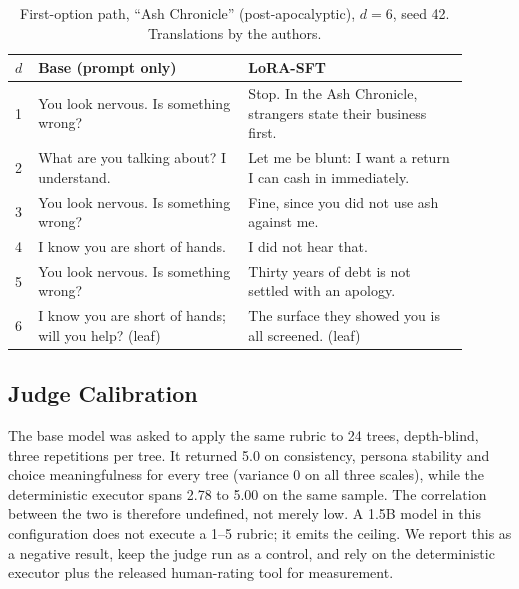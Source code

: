 \documentclass[conference]{IEEEtran}
\begin{document}
\begin{table}[t]\centering\small
\caption{First-option path, ``Ash Chronicle'' (post-apocalyptic), $d=6$, seed 42. Translations by
the authors.}
\label{tab:paths}
\begin{tabular}{p{0.04\linewidth}p{0.42\linewidth}p{0.44\linewidth}}
\toprule
$d$ & Base (prompt only) & LoRA-SFT\\
\midrule
1 & You look nervous. Is something wrong? & Stop. In the Ash Chronicle, strangers state their business first.\\
2 & What are you talking about? I understand. & Let me be blunt: I want a return I can cash in immediately.\\
3 & You look nervous. Is something wrong? & Fine, since you did not use ash against me.\\
4 & I know you are short of hands. & I did not hear that.\\
5 & You look nervous. Is something wrong? & Thirty years of debt is not settled with an apology.\\
6 & I know you are short of hands; will you help? (leaf) & The surface they showed you is all screened. (leaf)\\
\bottomrule
\end{tabular}
\end{table}

\subsection{Judge Calibration}
\label{sec:judge-calib}
The base model was asked to apply the same rubric to 24 trees, depth-blind, three repetitions per
tree. It returned 5.0 on consistency, persona stability and choice meaningfulness for every tree
(variance 0 on all three scales), while the deterministic executor spans 2.78 to 5.00 on the same
sample. The correlation between the two is therefore undefined, not merely low. A 1.5B model in
this configuration does not execute a 1--5 rubric; it emits the ceiling. We report this as a
negative result, keep the judge run as a control, and rely on the deterministic executor plus the
released human-rating tool for measurement.
\end{document}
